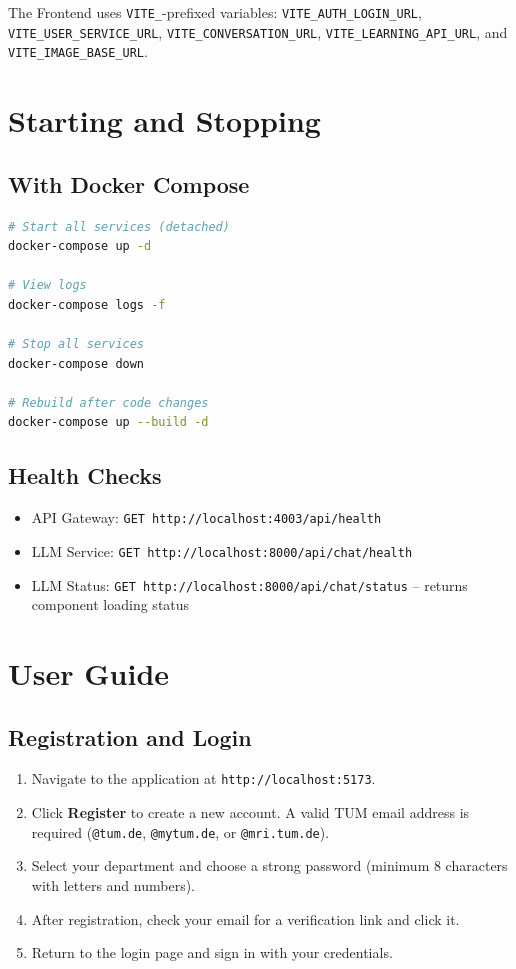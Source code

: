 \documentclass[a4paper,12pt]{report}
\begin{document}
The Frontend uses \texttt{VITE\_}-prefixed variables: \texttt{VITE\_AUTH\_LOGIN\_URL}, \texttt{VITE\_USER\_SERVICE\_URL}, \texttt{VITE\_CONVERSATION\_URL}, \texttt{VITE\_LEARNING\_API\_URL}, and \texttt{VITE\_IMAGE\_BASE\_URL}.

\section{Starting and Stopping}

\subsection{With Docker Compose}
\begin{lstlisting}[language=bash]
# Start all services (detached)
docker-compose up -d

# View logs
docker-compose logs -f

# Stop all services
docker-compose down

# Rebuild after code changes
docker-compose up --build -d
\end{lstlisting}

\subsection{Health Checks}
\begin{itemize}
    \item API Gateway: \texttt{GET http://localhost:4003/api/health}
    \item LLM Service: \texttt{GET http://localhost:8000/api/chat/health}
    \item LLM Status: \texttt{GET http://localhost:8000/api/chat/status} -- returns component loading status
\end{itemize}

\section{User Guide}

\subsection{Registration and Login}
\begin{enumerate}
    \item Navigate to the application at \texttt{http://localhost:5173}.
    \item Click \textbf{Register} to create a new account. A valid TUM email address is required (\texttt{@tum.de}, \texttt{@mytum.de}, or \texttt{@mri.tum.de}).
    \item Select your department and choose a strong password (minimum 8 characters with letters and numbers).
    \item After registration, check your email for a verification link and click it.
    \item Return to the login page and sign in with your credentials.
\end{enumerate}
\end{document}
